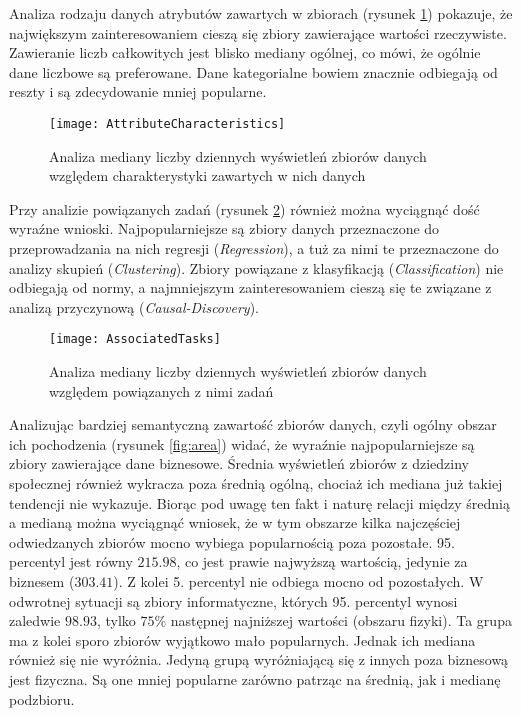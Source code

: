 Analiza rodzaju danych atrybutów zawartych w zbiorach (rysunek \ref{fig:attributecharacteristics}) pokazuje, że największym zainteresowaniem cieszą się zbiory zawierające wartości rzeczywiste.
Zawieranie liczb całkowitych jest blisko mediany ogólnej, co mówi, że ogólnie dane liczbowe są preferowane.
Dane kategorialne bowiem znacznie odbiegają od reszty i są zdecydowanie mniej popularne.

\begin{figure}[ht]
  \texttt{[image: AttributeCharacteristics]}
  \caption{Analiza mediany liczby dziennych wyświetleń zbiorów danych względem charakterystyki zawartych w nich danych}
  \label{fig:attributecharacteristics}
\end{figure}

Przy analizie powiązanych zadań (rysunek \ref{fig:associatedtasks}) również można wyciągnąć dość wyraźne wnioski.
Najpopularniejsze są zbiory danych przeznaczone do przeprowadzania na nich regresji (\emph{Regression}), a tuż za nimi te przeznaczone do analizy skupień (\emph{Clustering}).
Zbiory powiązane z klasyfikacją (\emph{Classification}) nie odbiegają od normy, a najmniejszym zainteresowaniem cieszą się te związane z analizą przyczynową (\emph{Causal-Discovery}).

\begin{figure}[ht]
  \texttt{[image: AssociatedTasks]}
  \caption{Analiza mediany liczby dziennych wyświetleń zbiorów danych względem powiązanych z nimi zadań}
  \label{fig:associatedtasks}
\end{figure}

Analizując bardziej semantyczną zawartość zbiorów danych, czyli ogólny obszar ich pochodzenia (rysunek \ref{fig:area}) widać, że wyraźnie najpopularniejsze są zbiory zawierające dane biznesowe.
Średnia wyświetleń zbiorów z dziedziny społecznej również wykracza poza średnią ogólną, chociaż ich mediana już takiej tendencji nie wykazuje.
Biorąc pod uwagę ten fakt i naturę relacji między średnią a medianą można wyciągnąć wniosek, że w tym obszarze kilka najczęściej odwiedzanych zbiorów mocno wybiega popularnością poza pozostałe.
95. percentyl jest równy \(215.98\), co jest prawie najwyższą wartością, jedynie za biznesem (\(303.41\)).
Z kolei 5. percentyl nie odbiega mocno od pozostałych.
W odwrotnej sytuacji są zbiory informatyczne, których 95. percentyl wynosi zaledwie \(98.93\), tylko \(75\%\) następnej najniższej wartości (obszaru fizyki).
Ta grupa ma z kolei sporo zbiorów wyjątkowo mało popularnych.
Jednak ich mediana również się nie wyróżnia.
Jedyną grupą wyróżniającą się z innych poza biznesową jest fizyczna.
Są one mniej popularne zarówno patrząc na średnią, jak i medianę podzbioru.

